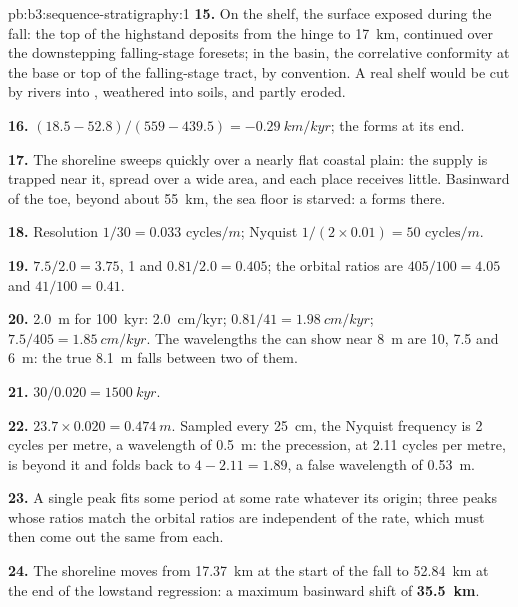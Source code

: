 \begin{solution}{pb:b3:sequence-stratigraphy:1}
\textbf{15.} On the shelf, the surface exposed during the fall: the top of
the highstand deposits from the hinge to \qty{17}{km}, continued over the
downstepping falling-stage foresets; in the basin, the correlative
conformity at the base or top of the falling-stage tract, by convention. A
real shelf would be cut by rivers into , weathered into soils,
and partly eroded.

\textbf{16.} $(18.5 - 52.8)/(559 - 439.5) = \qty{-0.29}{km/kyr}$; the
 forms at its end.

\textbf{17.} The shoreline sweeps quickly over a nearly flat coastal plain:
the supply is trapped near it, spread over a wide area, and each place
receives little. Basinward of the toe, beyond about \qty{55}{km}, the sea
floor is starved: a  forms there.

\textbf{18.} Resolution $1/30 = \num{0.033}\text{ cycles}/\unit{m}$; Nyquist $1/(2\times
0.01) = \num{50}\text{ cycles}/\unit{m}$.

\textbf{19.} $7.5/2.0 = 3.75$, 1 and $0.81/2.0 = 0.405$; the orbital ratios
are $405/100 = 4.05$ and $41/100 = 0.41$.

\textbf{20.} \qty{2.0}{m} for \qty{100}{kyr}: \qty{2.0}{cm/kyr}; $0.81/41 =
\qty{1.98}{cm/kyr}$; $7.5/405 = \qty{1.85}{cm/kyr}$. The wavelengths the
 can show near \qty{8}{m} are 10, 7.5 and \qty{6}{m}: the true
\qty{8.1}{m} falls between two of them.

\textbf{21.} $30/0.020 = \qty{1500}{kyr}$.

\textbf{22.} $23.7\times0.020 = \qty{0.474}{m}$. Sampled every
\qty{25}{cm}, the Nyquist frequency is 2 cycles per metre, a wavelength of
\qty{0.5}{m}: the precession, at 2.11 cycles per metre, is beyond it and
folds back to $4 - 2.11 = 1.89$, a false wavelength of \qty{0.53}{m}.

\textbf{23.} A single peak fits some period at some rate whatever its
origin; three peaks whose ratios match the orbital ratios are independent of
the rate, which must then come out the same from each.

\textbf{24.} The shoreline moves from \qty{17.37}{km} at the start of the
fall to \qty{52.84}{km} at the end of the lowstand regression: a maximum
basinward shift of \textbf{\qty[text-series-to-math=true]{35.5}{km}}.
\end{solution}
